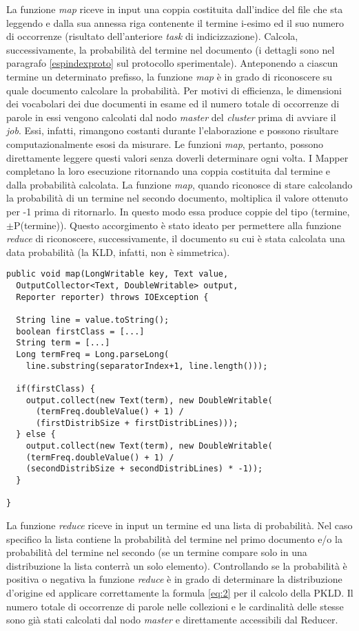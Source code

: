 La funzione \textit{map} riceve in input una coppia costituita dall’indice del file che sta leggendo e dalla sua annessa riga contenente il termine i-esimo ed il suo numero di occorrenze 
(risultato dell’anteriore \textit{task} di indicizzazione).
Calcola, successivamente, la probabilità del termine nel documento (i dettagli sono nel paragrafo \ref{espindexproto} sul protocollo sperimentale).
Anteponendo a ciascun termine un determinato prefisso, la funzione \textit{map} è in grado di riconoscere su quale documento calcolare la probabilità.
Per motivi di efficienza, le dimensioni dei vocabolari dei due documenti in esame ed il numero totale di occorrenze di parole in essi vengono calcolati dal nodo \textit{master} del \textit{cluster} prima di avviare il \textit{job}.
Essi, infatti, rimangono costanti durante l’elaborazione e possono risultare computazionalmente esosi da misurare.
Le funzioni \textit{map}, pertanto, possono direttamente leggere questi valori senza doverli determinare ogni volta.
I Mapper completano la loro esecuzione ritornando una coppia costituita dal termine e dalla probabilità calcolata. 
La funzione \textit{map}, quando riconosce di stare calcolando la probabilità di un termine nel secondo documento, moltiplica il valore ottenuto per -1 prima di ritornarlo.
In questo modo essa produce coppie del tipo (termine, $\pm$P(termine)).
Questo accorgimento è stato ideato per permettere alla funzione \textit{reduce} di riconoscere, successivamente, il documento su cui è stata calcolata una data probabilità 
(la KLD, infatti, non è simmetrica).

\begin{lstlisting}[frame=single]
public void map(LongWritable key, Text value, 
  OutputCollector<Text, DoubleWritable> output, 
  Reporter reporter) throws IOException {

  String line = value.toString();
  boolean firstClass = [...]
  String term = [...]
  Long termFreq = Long.parseLong(
    line.substring(separatorIndex+1, line.length()));

  if(firstClass) {
    output.collect(new Text(term), new DoubleWritable(
      (termFreq.doubleValue() + 1) / 
      (firstDistribSize + firstDistribLines)));
  } else {
    output.collect(new Text(term), new DoubleWritable(
    (termFreq.doubleValue() + 1) / 
    (secondDistribSize + secondDistribLines) * -1));
  }
  
}
\end{lstlisting}

La funzione \textit{reduce} riceve in input un termine ed una lista di probabilità.
Nel caso specifico la lista contiene la probabilità del termine nel primo documento e/o la probabilità del termine nel secondo (se un termine compare solo in una distribuzione la lista conterrà un solo elemento).
Controllando se la probabilità è positiva o negativa la funzione \textit{reduce} è in grado di determinare la distribuzione d’origine ed applicare correttamente la formula \ref{eq:2} per il calcolo della PKLD.
Il numero totale di occorrenze di parole nelle collezioni e le cardinalità delle stesse sono già stati calcolati dal nodo \textit{master} e direttamente accessibili dal Reducer.

